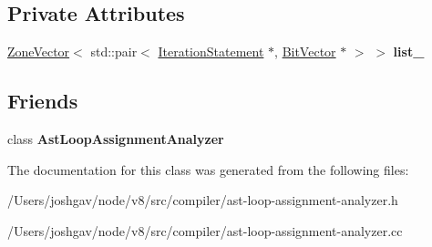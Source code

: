 \subsection*{Private Attributes}
\begin{DoxyCompactItemize}
\item 
\hyperlink{classv8_1_1internal_1_1_zone_vector}{Zone\+Vector}$<$ std\+::pair$<$ \hyperlink{classv8_1_1internal_1_1_iteration_statement}{Iteration\+Statement} $\ast$, \hyperlink{classv8_1_1internal_1_1_bit_vector}{Bit\+Vector} $\ast$ $>$ $>$ {\bfseries list\+\_\+}\hypertarget{classv8_1_1internal_1_1compiler_1_1_loop_assignment_analysis_a29f99bfb1793b8440bf100c53e2553cb}{}\label{classv8_1_1internal_1_1compiler_1_1_loop_assignment_analysis_a29f99bfb1793b8440bf100c53e2553cb}

\end{DoxyCompactItemize}
\subsection*{Friends}
\begin{DoxyCompactItemize}
\item 
class {\bfseries Ast\+Loop\+Assignment\+Analyzer}\hypertarget{classv8_1_1internal_1_1compiler_1_1_loop_assignment_analysis_a50e3353004b5d4f3f0fdf2b533ec5342}{}\label{classv8_1_1internal_1_1compiler_1_1_loop_assignment_analysis_a50e3353004b5d4f3f0fdf2b533ec5342}

\end{DoxyCompactItemize}


The documentation for this class was generated from the following files\+:\begin{DoxyCompactItemize}
\item 
/\+Users/joshgav/node/v8/src/compiler/ast-\/loop-\/assignment-\/analyzer.\+h\item 
/\+Users/joshgav/node/v8/src/compiler/ast-\/loop-\/assignment-\/analyzer.\+cc\end{DoxyCompactItemize}
